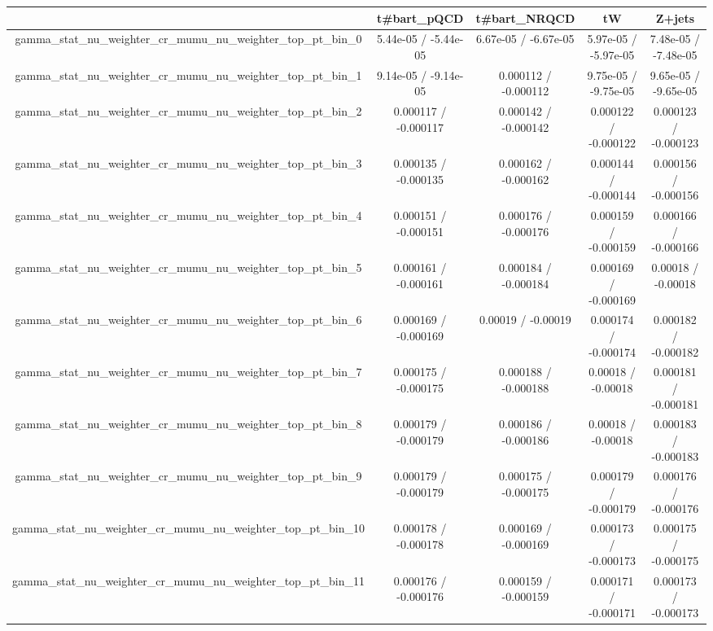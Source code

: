 \documentclass[10pt]{article}
\begin{document}
\begin{table}[htbp]
\begin{center}
\begin{tabular}{|c|c|c|c|c|}
\hline 
      & t#bar{t}_{pQCD}      & t#bar{t}_{NRQCD}      & tW      & Z+jets \\ 
\hline 
  gamma_stat_nu_weighter_cr_mumu_nu_weighter_top_pt_bin_0 & 5.44e-05 / -5.44e-05 & 6.67e-05 / -6.67e-05 & 5.97e-05 / -5.97e-05 & 7.48e-05 / -7.48e-05 \\ 
  gamma_stat_nu_weighter_cr_mumu_nu_weighter_top_pt_bin_1 & 9.14e-05 / -9.14e-05 & 0.000112 / -0.000112 & 9.75e-05 / -9.75e-05 & 9.65e-05 / -9.65e-05 \\ 
  gamma_stat_nu_weighter_cr_mumu_nu_weighter_top_pt_bin_2 & 0.000117 / -0.000117 & 0.000142 / -0.000142 & 0.000122 / -0.000122 & 0.000123 / -0.000123 \\ 
  gamma_stat_nu_weighter_cr_mumu_nu_weighter_top_pt_bin_3 & 0.000135 / -0.000135 & 0.000162 / -0.000162 & 0.000144 / -0.000144 & 0.000156 / -0.000156 \\ 
  gamma_stat_nu_weighter_cr_mumu_nu_weighter_top_pt_bin_4 & 0.000151 / -0.000151 & 0.000176 / -0.000176 & 0.000159 / -0.000159 & 0.000166 / -0.000166 \\ 
  gamma_stat_nu_weighter_cr_mumu_nu_weighter_top_pt_bin_5 & 0.000161 / -0.000161 & 0.000184 / -0.000184 & 0.000169 / -0.000169 & 0.00018 / -0.00018 \\ 
  gamma_stat_nu_weighter_cr_mumu_nu_weighter_top_pt_bin_6 & 0.000169 / -0.000169 & 0.00019 / -0.00019 & 0.000174 / -0.000174 & 0.000182 / -0.000182 \\ 
  gamma_stat_nu_weighter_cr_mumu_nu_weighter_top_pt_bin_7 & 0.000175 / -0.000175 & 0.000188 / -0.000188 & 0.00018 / -0.00018 & 0.000181 / -0.000181 \\ 
  gamma_stat_nu_weighter_cr_mumu_nu_weighter_top_pt_bin_8 & 0.000179 / -0.000179 & 0.000186 / -0.000186 & 0.00018 / -0.00018 & 0.000183 / -0.000183 \\ 
  gamma_stat_nu_weighter_cr_mumu_nu_weighter_top_pt_bin_9 & 0.000179 / -0.000179 & 0.000175 / -0.000175 & 0.000179 / -0.000179 & 0.000176 / -0.000176 \\ 
  gamma_stat_nu_weighter_cr_mumu_nu_weighter_top_pt_bin_10 & 0.000178 / -0.000178 & 0.000169 / -0.000169 & 0.000173 / -0.000173 & 0.000175 / -0.000175 \\ 
  gamma_stat_nu_weighter_cr_mumu_nu_weighter_top_pt_bin_11 & 0.000176 / -0.000176 & 0.000159 / -0.000159 & 0.000171 / -0.000171 & 0.000173 / -0.000173 \\ 

\end{tabular}
\end{center}
\end{table}
\end{document}
